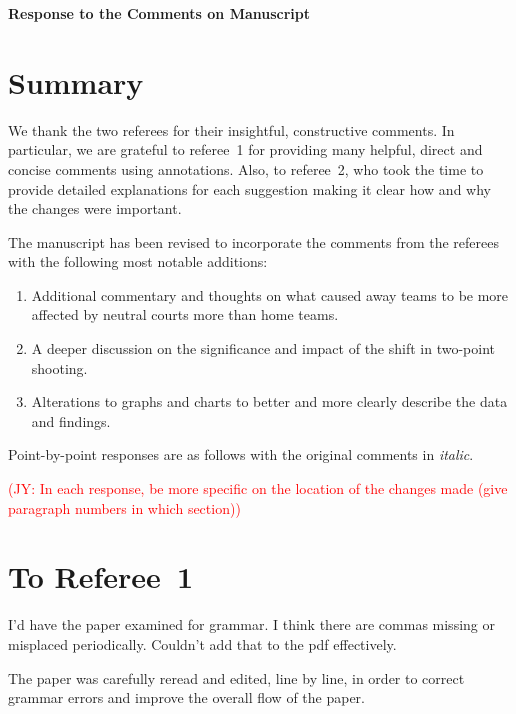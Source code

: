 \documentclass[12pt]{article}
\newcommand{\jy}[1]{\textcolor{red}{(JY: #1)}}
\newenvironment{comment}%
{\begin{quoting}\noindent\small\it\ignorespaces%
  }{\end{quoting}}
\begin{document}
\begin{center}
  {\Large\bf Response to the Comments on Manuscript}
\end{center}

\section*{Summary}

We thank the two referees for their insightful, constructive
comments. In particular, we are grateful to referee~1 for providing
many helpful, direct and concise comments using annotations. Also, to
referee~2, who took the time to provide detailed explanations for each
suggestion making it clear how and why the changes were important.

The manuscript has been revised to incorporate the comments from the
referees with the following most notable additions:

\begin{enumerate}
\item
  Additional commentary and thoughts on what caused away teams to
  be more affected by neutral courts more than home teams.
  \item
  A deeper discussion on the significance and impact of the shift 
  in two-point shooting.
\item
  Alterations to graphs and charts to better and more clearly describe
  the data and findings.
\end{enumerate}

Point-by-point responses are as follows with the original comments in \emph{italic}.

\jy{In each response, be more specific on the location of the changes made (give
  paragraph numbers in which section)}

\section*{To Referee~1}

\begin{comment}
  I’d have the paper examined for grammar.  I think there are commas missing or 
  misplaced periodically. Couldn’t add that to the pdf effectively.
\end{comment}

 The paper was carefully reread and edited, line by line, in order to
 correct grammar errors and improve the overall flow of the paper.
 
\end{document}
